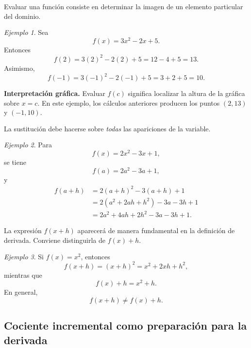 \documentclass[12pt]{article}
\theoremstyle{remark}
\newtheorem{ejemplo}{Ejemplo}[section]
\begin{document}
Evaluar una función consiste en determinar la imagen de un elemento particular
del dominio.

\begin{ejemplo}
Sea
\[
f(x)=3x^2-2x+5.
\]
Entonces
\[
f(2)=3(2)^2-2(2)+5=12-4+5=13.
\]
Asimismo,
\[
f(-1)=3(-1)^2-2(-1)+5=3+2+5=10.
\]

\textbf{Interpretación gráfica.} Evaluar $f(c)$ significa localizar la altura
de la gráfica sobre $x=c$. En este ejemplo, los cálculos anteriores producen
los puntos $(2,13)$ y $(-1,10)$.
\begin{center}
\end{center}
\end{ejemplo}

La sustitución debe hacerse sobre \emph{todas} las apariciones de la variable.

\begin{ejemplo}
Para
\[
f(x)=2x^2-3x+1,
\]
se tiene
\[
f(a)=2a^2-3a+1,
\]
y
\begin{align*}
f(a+h)
 &=2(a+h)^2-3(a+h)+1\\
 &=2(a^2+2ah+h^2)-3a-3h+1\\
 &=2a^2+4ah+2h^2-3a-3h+1.
\end{align*}
\end{ejemplo}

La expresión $f(x+h)$ aparecerá de manera fundamental en la definición de
derivada. Conviene distinguirla de $f(x)+h$.

\begin{ejemplo}
Si $f(x)=x^2$, entonces
\[
f(x+h)=(x+h)^2=x^2+2xh+h^2,
\]
mientras que
\[
f(x)+h=x^2+h.
\]
En general,
\[
f(x+h)\neq f(x)+h.
\]
\end{ejemplo}

\subsection*{Cociente incremental como preparación para la derivada}
\end{document}
